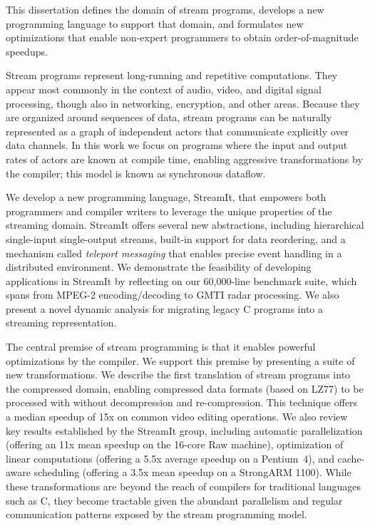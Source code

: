 This dissertation defines the domain of stream programs, develops a
new programming language to support that domain, and formulates new
optimizations that enable non-expert programmers to obtain
order-of-magnitude speedups.

Stream programs represent long-running and repetitive computations.
They appear most commonly in the context of audio, video, and digital
signal processing, though also in networking, encryption, and other
areas.  Because they are organized around sequences of data, stream
programs can be naturally represented as a graph of independent actors
that communicate explicitly over data channels.  In this work we focus
on programs where the input and output rates of actors are known at
compile time, enabling aggressive transformations by the compiler;
this model is known as synchronous dataflow.

We develop a new programming language, StreamIt, that empowers both
programmers and compiler writers to leverage the unique properties of
the streaming domain.  StreamIt offers several new abstractions,
including hierarchical single-input single-output streams, built-in
support for data reordering, and a mechanism called {\it teleport
  messaging} that enables precise event handling in a distributed
environment.  We demonstrate the feasibility of developing
applications in StreamIt by reflecting on our 60,000-line benchmark
suite, which spans from MPEG-2 encoding/decoding to GMTI radar
processing.  We also present a novel dynamic analysis for migrating
legacy C programs into a streaming representation.

The central premise of stream programming is that it enables powerful
optimizations by the compiler.  We support this premise by presenting
a suite of new transformations.  We describe the first translation of
stream programs into the compressed domain, enabling compressed data
formats (based on LZ77) to be processed with without decompression and
re-compression.  This technique offers a median speedup of 15x on
common video editing operations.  We also review key results
established by the StreamIt group, including automatic parallelization
(offering an 11x mean speedup on the 16-core Raw machine),
optimization of linear computations (offering a 5.5x average speedup
on a Pentium~4), and cache-aware scheduling (offering a 3.5x mean
speedup on a StrongARM 1100).  While these transformations are beyond
the reach of compilers for traditional languages such as C, they
become tractable given the abundant parallelism and regular
communication patterns exposed by the stream programming model.

